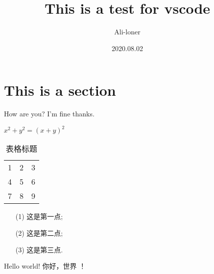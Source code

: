 \documentclass[a4paper]{article}
\title{This is a test for vscode}
\author{Ali-loner}
\date{2020.08.02}
\begin{document}
    \maketitle
\begin{abstract}
    \lipsum[2]
\end{abstract}
\tableofcontents
\section{This is a section}
How are you?
I'm fine thanks.  

$x^2+y^2 = (x+y)^2$
\begin{table}[htbp]
    \centering
    \caption{表格标题}
    \begin{tabular}{ccc}
        1 & 2 & 3 \\
        4 & 5 & 6 \\
        7 & 8 & 9
    \end{tabular}
\end{table}
\begin{enumerate}
    \item[(1)] 这是第一点; 
    \item[(2)] 这是第二点;
    \item[(3)] 这是第三点. 
\end{enumerate}
Hello world! 你好，世界 ！
\end{document}
